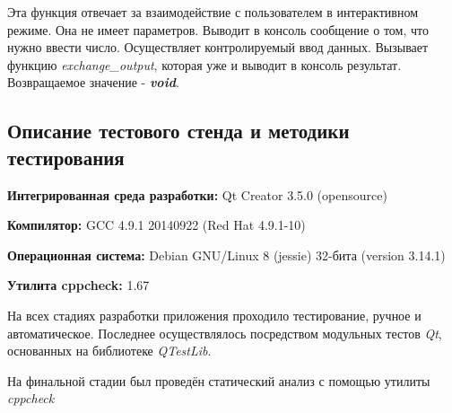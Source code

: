 \documentclass[12pt,a4paper]{report}
\begin{document}
\begin{enumerate}
\begin{itemize}
Эта функция отвечает за взаимодействие с пользователем в интерактивном режиме. Она не имеет параметров. Выводит в консоль сообщение о том, что нужно ввести число. Осуществляет контролируемый ввод данных. Вызывает функцию \textit{exchange\_output}, которая уже и выводит в консоль результат. Возвращаемое значение - \textit{\textbf{void}}.
\end{itemize}
\end{enumerate}
\subsection{Описание тестового стенда и методики тестирования}

\begin{flushleft}
\textbf{Интегрированная среда разработки:} Qt Creator 3.5.0 (opensource)

\textbf{Компилятор:} GCC 4.9.1 20140922 (Red Hat 4.9.1-10)

\textbf{Операционная система:} Debian GNU/Linux 8 (jessie) 32-бита (version 3.14.1)

\textbf{Утилита cppcheck:} 1.67
\end{flushleft}

На всех стадиях разработки приложения проходило тестирование, ручное и автоматическое. Последнее осуществлялось посредством модульных тестов \textit{Qt}, основанных на библиотеке  \textit{QTestLib}.

На финальной стадии был проведён статический анализ с помощью утилиты \textit{cppcheck}%
\end{document}
